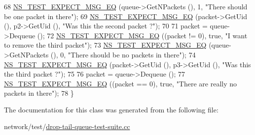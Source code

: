 \begin{DoxyCode}
68   \hyperlink{group__testing_ga7304ba46a28d8cf08dfdfd6499cf7068}{NS\_TEST\_EXPECT\_MSG\_EQ} (queue->GetNPackets (), 1, \textcolor{stringliteral}{"There should be one packet in
       there"});
69   \hyperlink{group__testing_ga7304ba46a28d8cf08dfdfd6499cf7068}{NS\_TEST\_EXPECT\_MSG\_EQ} (packet->GetUid (), p2->GetUid (), \textcolor{stringliteral}{"Was this the second packet
       ?"});
70 
71   packet = queue->Dequeue ();
72   \hyperlink{group__testing_ga7304ba46a28d8cf08dfdfd6499cf7068}{NS\_TEST\_EXPECT\_MSG\_EQ} ((packet != 0), \textcolor{keyword}{true}, \textcolor{stringliteral}{"I want to remove the third packet"});
73   \hyperlink{group__testing_ga7304ba46a28d8cf08dfdfd6499cf7068}{NS\_TEST\_EXPECT\_MSG\_EQ} (queue->GetNPackets (), 0, \textcolor{stringliteral}{"There should be no packets in
       there"});
74   \hyperlink{group__testing_ga7304ba46a28d8cf08dfdfd6499cf7068}{NS\_TEST\_EXPECT\_MSG\_EQ} (packet->GetUid (), p3->GetUid (), \textcolor{stringliteral}{"Was this the third packet
       ?"});
75 
76   packet = queue->Dequeue ();
77   \hyperlink{group__testing_ga7304ba46a28d8cf08dfdfd6499cf7068}{NS\_TEST\_EXPECT\_MSG\_EQ} ((packet == 0), \textcolor{keyword}{true}, \textcolor{stringliteral}{"There are really no packets in there"});
78 \}
\end{DoxyCode}


The documentation for this class was generated from the following file\+:\begin{DoxyCompactItemize}
\item 
network/test/\hyperlink{drop-tail-queue-test-suite_8cc}{drop-\/tail-\/queue-\/test-\/suite.\+cc}\end{DoxyCompactItemize}
